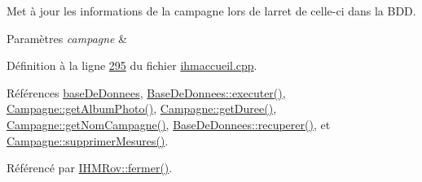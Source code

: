 Met à jour les informations de la campagne lors de l\textquotesingle{}arret de celle-\/ci dans la B\+DD. 


\begin{DoxyParams}{Paramètres}
{\em campagne} & \\
\hline
\end{DoxyParams}


Définition à la ligne \hyperlink{ihmaccueil_8cpp_source_l00295}{295} du fichier \hyperlink{ihmaccueil_8cpp_source}{ihmaccueil.\+cpp}.



Références \hyperlink{ihmaccueil_8h_source_l00040}{base\+De\+Donnees}, \hyperlink{basededonnees_8cpp_source_l00104}{Base\+De\+Donnees\+::executer()}, \hyperlink{campagne_8cpp_source_l00070}{Campagne\+::get\+Album\+Photo()}, \hyperlink{campagne_8cpp_source_l00044}{Campagne\+::get\+Duree()}, \hyperlink{campagne_8cpp_source_l00019}{Campagne\+::get\+Nom\+Campagne()}, \hyperlink{basededonnees_8cpp_source_l00139}{Base\+De\+Donnees\+::recuperer()}, et \hyperlink{campagne_8cpp_source_l00095}{Campagne\+::supprimer\+Mesures()}.



Référencé par \hyperlink{ihmrov_8cpp_source_l00253}{I\+H\+M\+Rov\+::fermer()}.


